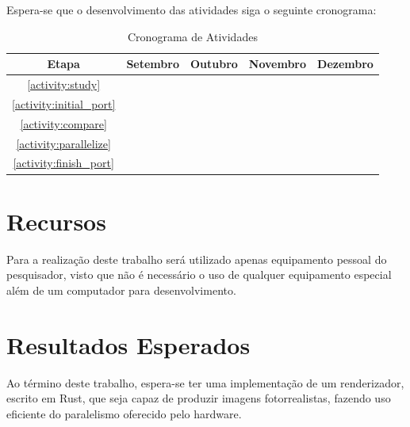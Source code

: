 \documentclass[12pt]{article}
\begin{document}
Espera-se que o desenvolvimento das atividades siga o seguinte cronograma:

\begin{table}[ht]
\centering
\begin{tabular}{c|cccc}
	Etapa & Setembro & Outubro & Novembro & Dezembro \\ \hline
	\ref{activity:study} & \checkmark & & & \\
	\ref{activity:initial_port} & \checkmark & \checkmark & & \\
	\ref{activity:compare} & & \checkmark & & \checkmark \\
	\ref{activity:parallelize} & & \checkmark & \checkmark & \checkmark \\
	\ref{activity:finish_port} & & & \checkmark & \checkmark \\
\end{tabular}
\caption{Cronograma de Atividades}
\end{table}

\section{Recursos}

Para a realização deste trabalho será utilizado apenas equipamento pessoal do pesquisador, visto que
não é necessário o uso de qualquer equipamento especial além de um computador para desenvolvimento.

\section{Resultados Esperados}

Ao término deste trabalho, espera-se ter uma implementação de um renderizador, escrito em Rust, que
seja capaz de produzir imagens fotorrealistas, fazendo uso eficiente do paralelismo oferecido pelo
hardware.



\end{document}
